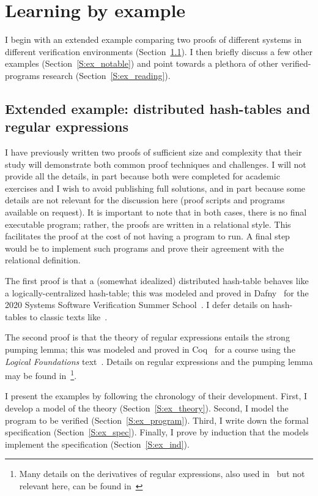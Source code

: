 \section{Learning by example}\label{S:examples}

I begin with an extended example comparing two proofs of different systems in
different verification environments (Section~\ref{S:ex_ext}). I then briefly
discuss a few other examples (Section~\ref{S:ex_notable}) and point towards a
plethora of other verified-programs research (Section~\ref{S:ex_reading}).

\subsection{Extended example: distributed hash-tables and regular
expressions}\label{S:ex_ext}

I have previously written two proofs of sufficient size and complexity that
their study will demonstrate both common proof techniques and challenges. I will
not provide all the details, in part because both were completed for academic
exercises and I wish to avoid publishing full solutions, and in part because
some details are not relevant for the discussion here (proof scripts and
programs available on request). It is important to note that in both cases,
there is no final executable program; rather, the proofs are written in a
relational style. This facilitates the proof at the cost of not having a program
to run. A final step would be to implement such programs and prove their
agreement with the relational definition.

The first proof is that a (somewhat idealized) distributed hash-table behaves
like a logically-centralized hash-table; this was modeled and proved in
Dafny~\cite{leino2010dafny} for the 2020 Systems Software Verification Summer
School~\cite{Kapritsos_2020}. I defer details on hash-tables to classic texts
like~\cite{CLRS}.

The second proof is that the theory of regular expressions entails the strong
pumping lemma; this was modeled and proved in Coq~\cite{Coq} for a course using
the \emph{Logical Foundations} text~\cite{Pierce:SF1}. Details on regular
expressions and the pumping lemma may be found
in~\cite{Lewis_1997,Morrisett_2012}\footnote{Many details on the derivatives of
regular expressions, also used in~\cite{Pierce:SF1,Morrisett_2012} but not
relevant here, can be found in~\cite{Might_Yacc,Might_desugar,Might_deriv}}.

I present the examples by following the chronology of their development. First,
I develop a model of the theory (Section~\ref{S:ex_theory}). Second, I model the
program to be verified (Section~\ref{S:ex_program}). Third, I write down the
formal specification (Section~\ref{S:ex_spec}). Finally, I prove by induction
that the models implement the specification (Section~\ref{S:ex_ind}).


